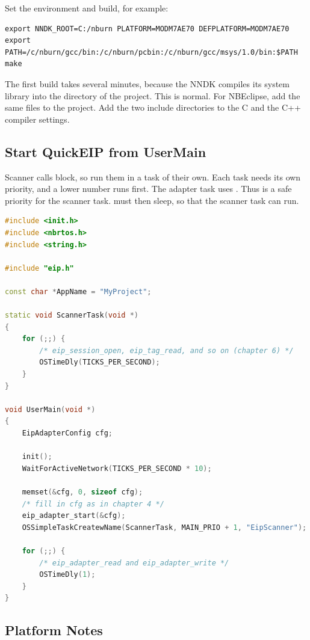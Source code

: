 Set the environment and build, for example:

\begin{lstlisting}[language=shell]
export NNDK_ROOT=C:/nburn PLATFORM=MODM7AE70 DEFPLATFORM=MODM7AE70
export PATH=/c/nburn/gcc/bin:/c/nburn/pcbin:/c/nburn/gcc/msys/1.0/bin:$PATH
make
\end{lstlisting}

The first build takes several minutes, because the NNDK compiles its system
library into the  directory of the project. This is normal. For
NBEclipse, add the same files to the project. Add the two include directories
to the C and the C++ compiler settings.

\subsection{Start QuickEIP from UserMain}

Scanner calls block, so run them in a task of their own. Each task needs its
own priority, and a lower number runs first. The adapter task uses
. Thus  is a safe priority for the
scanner task.  must then sleep, so that the scanner task can
run.

\begin{lstlisting}[language=C++]
#include <init.h>
#include <nbrtos.h>
#include <string.h>

#include "eip.h"

const char *AppName = "MyProject";

static void ScannerTask(void *)
{
    for (;;) {
        /* eip_session_open, eip_tag_read, and so on (chapter 6) */
        OSTimeDly(TICKS_PER_SECOND);
    }
}

void UserMain(void *)
{
    EipAdapterConfig cfg;

    init();
    WaitForActiveNetwork(TICKS_PER_SECOND * 10);

    memset(&cfg, 0, sizeof cfg);
    /* fill in cfg as in chapter 4 */
    eip_adapter_start(&cfg);
    OSSimpleTaskCreatewName(ScannerTask, MAIN_PRIO + 1, "EipScanner");

    for (;;) {
        /* eip_adapter_read and eip_adapter_write */
        OSTimeDly(1);
    }
}
\end{lstlisting}

\subsection{Platform Notes}

